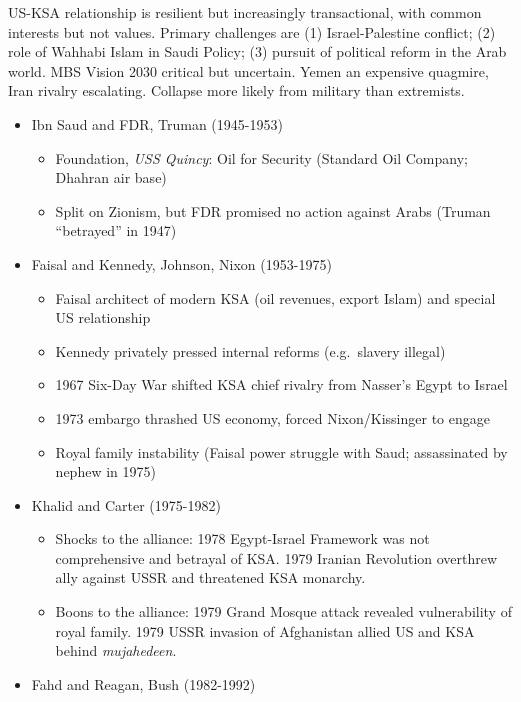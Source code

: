 \documentclass[
]{article}
\begin{document}
US-KSA relationship is resilient but increasingly transactional, with
common interests but not values. Primary challenges are (1)
Israel-Palestine conflict; (2) role of Wahhabi Islam in Saudi Policy;
(3) pursuit of political reform in the Arab world. MBS Vision 2030
critical but uncertain. Yemen an expensive quagmire, Iran rivalry
escalating. Collapse more likely from military than extremists.

\begin{itemize}
\item
  Ibn Saud and FDR, Truman (1945-1953)

  \begin{itemize}
  \item
    Foundation, \emph{USS Quincy}: Oil for Security (Standard Oil
    Company; Dhahran air base)
  \item
    Split on Zionism, but FDR promised no action against Arabs (Truman
    ``betrayed'' in 1947)
  \end{itemize}
\item
  Faisal and Kennedy, Johnson, Nixon (1953-1975)

  \begin{itemize}
  \item
    Faisal architect of modern KSA (oil revenues, export Islam) and
    special US relationship
  \item
    Kennedy privately pressed internal reforms (e.g.~slavery illegal)
  \item
    1967 Six-Day War shifted KSA chief rivalry from Nasser's Egypt to
    Israel
  \item
    1973 embargo thrashed US economy, forced Nixon/Kissinger to engage
  \item
    Royal family instability (Faisal power struggle with Saud;
    assassinated by nephew in 1975)
  \end{itemize}
\item
  Khalid and Carter (1975-1982)

  \begin{itemize}
  \item
    Shocks to the alliance: 1978 Egypt-Israel Framework was not
    comprehensive and betrayal of KSA. 1979 Iranian Revolution overthrew
    ally against USSR and threatened KSA monarchy.
  \item
    Boons to the alliance: 1979 Grand Mosque attack revealed
    vulnerability of royal family. 1979 USSR invasion of Afghanistan
    allied US and KSA behind \emph{mujahedeen}.
  \end{itemize}
\item
  Fahd and Reagan, Bush (1982-1992)


\end{itemize}
\end{document}
